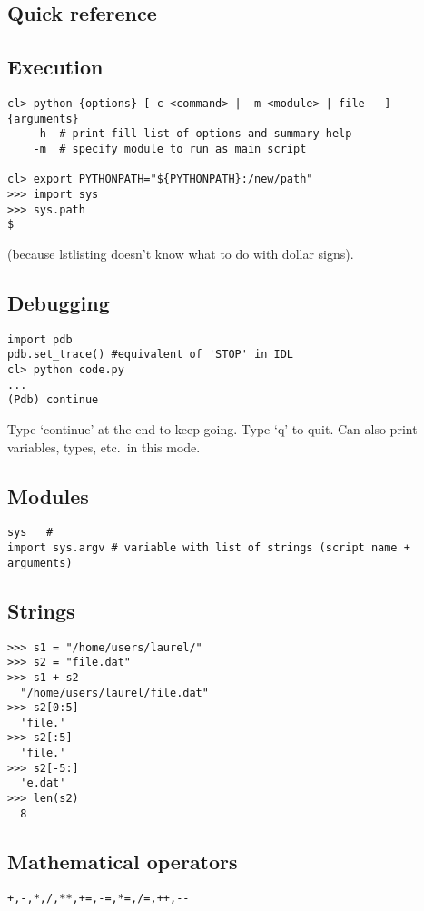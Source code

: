 \documentclass{article}
\begin{document}
\begin{multicols}{2}
\raggedcolumns
\section{Quick reference}
\setcounter{secnumdepth}{0}

\subsection{Execution}
\begin{lstlisting}
cl> python {options} [-c <command> | -m <module> | file - ] {arguments}
    -h  # print fill list of options and summary help
    -m  # specify module to run as main script

cl> export PYTHONPATH="${PYTHONPATH}:/new/path"
>>> import sys
>>> sys.path
$
\end{lstlisting}
(because lstlisting doesn't know what to do with dollar signs).

\subsection{Debugging}
\begin{lstlisting}
import pdb
pdb.set_trace() #equivalent of 'STOP' in IDL
cl> python code.py
...
(Pdb) continue
\end{lstlisting}
Type `continue' at the end to keep going. Type `q' to quit.
Can also print variables, types, etc.\ in this mode.

\subsection{Modules}
\begin{lstlisting}
sys   #
import sys.argv # variable with list of strings (script name + arguments)
\end{lstlisting}

\subsection{Strings}
\begin{lstlisting}
>>> s1 = "/home/users/laurel/"
>>> s2 = "file.dat"
>>> s1 + s2
  "/home/users/laurel/file.dat"
>>> s2[0:5]
  'file.'
>>> s2[:5]
  'file.'
>>> s2[-5:]
  'e.dat'
>>> len(s2)
  8
\end{lstlisting}

\subsection{Mathematical operators}
\begin{lstlisting}
+,-,*,/,**,+=,-=,*=,/=,++,--
\end{lstlisting}


\end{multicols}
\end{document}
